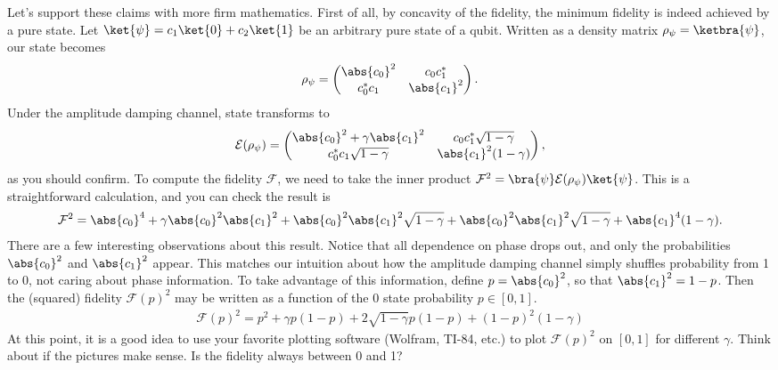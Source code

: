 \documentclass{book}
\begin{document}
    Let's support these claims with more firm mathematics. First of all, by concavity of the fidelity, the minimum fidelity is indeed achieved by a pure state. Let $\ket{\psi} = c_1 \ket{0} + c_2 \ket{1}$ be an arbitrary pure state of a qubit. Written as a density matrix $\rho_\psi = \ketbra{\psi}$, our state becomes
    \begin{align}
        \rho_\psi = \begin{pmatrix}
            \abs{c_0}^2 & c_0 c_1^* \\
            c_0^* c_1 & \abs{c_1}^2
        \end{pmatrix}.
    \end{align}
    Under the amplitude damping channel, state transforms to 
    \begin{align}
        \mathcal{E}(\rho_\psi) = \begin{pmatrix}
            \abs{c_0}^2 + \gamma \abs{c_1}^2 & c_0 c_1^*\sqrt{1-\gamma} \\
            c_0^* c_1\sqrt{1-\gamma} & \abs{c_1}^2(1-\gamma)
        \end{pmatrix},
    \end{align}
    as you should confirm. To compute the fidelity $\mathcal{F}$, we need to take the inner product $\mathcal{F}^2 = \bra{\psi} \mathcal{E}(\rho_\psi) \ket{\psi}$. This is a straightforward calculation, and you can check the result is
    \begin{align}
        \mathcal{F}^2 = \abs{c_0}^4 + \gamma \abs{c_0}^2 \abs{c_1}^2 + \abs{c_0}^2 \abs{c_1}^2 \sqrt{1-\gamma} + \abs{c_0}^2 \abs{c_1}^2 \sqrt{1-\gamma} + \abs{c_1}^4 (1-\gamma).
    \end{align}
    There are a few interesting observations about this result. Notice that all dependence on phase drops out, and only the probabilities $\abs{c_0}^2$ and $\abs{c_1}^2$ appear. This matches our intuition about how the amplitude damping channel simply shuffles probability from 1 to 0, not caring about phase information. To take advantage of this information, define $p = \abs{c_0}^2$, so that $\abs{c_1}^2 = 1- p$. Then the (squared) fidelity $\mathcal{F}(p)^2$ may be written as a function of the 0 state probability $p \in [0,1]$. 
    \begin{align}
        \mathcal{F}(p)^2 = p^2 + \gamma p (1-p) + 2\sqrt{1-\gamma}p(1-p) + (1-p)^2 (1-\gamma)
    \end{align}
    At this point, it is a good idea to use your favorite plotting software (Wolfram, TI-84, etc.) to plot $\mathcal{F}(p)^2$ on $[0,1]$ for different $\gamma$. Think about if the pictures make sense. Is the fidelity always between 0 and 1? 
\end{document}
